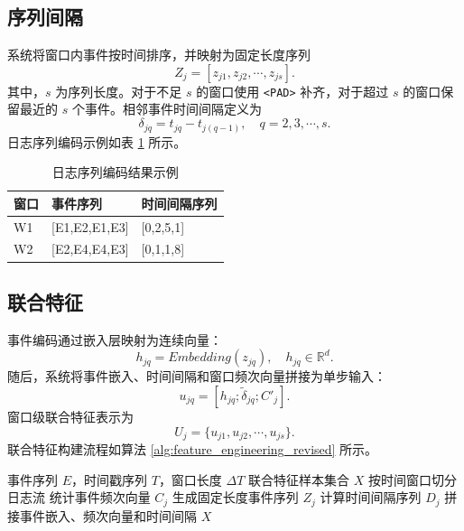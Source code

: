 \subsection{序列间隔}

系统将窗口内事件按时间排序，并映射为固定长度序列
\begin{equation}
    Z_j=[z_{j1},z_{j2},\cdots,z_{js}].
\end{equation}
其中，$s$ 为序列长度。对于不足 $s$ 的窗口使用 \texttt{<PAD>} 补齐，对于超过 $s$ 的窗口保留最近的 $s$ 个事件。相邻事件时间间隔定义为
\begin{equation}
    \delta_{jq}=t_{jq}-t_{j(q-1)},\quad q=2,3,\cdots,s.
\end{equation}
日志序列编码示例如表 \ref{tab:sequence_encoding_example_revised} 所示。

\begin{table}[htbp]
    \centering
    \caption{日志序列编码结果示例}
    \label{tab:sequence_encoding_example_revised}
    \begin{tabular}{p{2cm}p{4.5cm}p{4.5cm}}
        \hline
        \textbf{窗口} & \textbf{事件序列} & \textbf{时间间隔序列} \\
        \hline
        W1 & [E1,E2,E1,E3] & [0,2,5,1] \\
        W2 & [E2,E4,E4,E3] & [0,1,1,8] \\
        \hline
    \end{tabular}
\end{table}

\subsection{联合特征}

事件编码通过嵌入层映射为连续向量：
\begin{equation}
    h_{jq}=Embedding(z_{jq}),\quad h_{jq}\in\mathbb{R}^{d}.
\end{equation}
随后，系统将事件嵌入、时间间隔和窗口频次向量拼接为单步输入：
\begin{equation}
    u_{jq}=[h_{jq};\tilde{\delta}_{jq};C'_j].
\end{equation}
窗口级联合特征表示为
\begin{equation}
    U_j=\{u_{j1},u_{j2},\cdots,u_{js}\}.
\end{equation}
联合特征构建流程如算法 \ref{alg:feature_engineering_revised} 所示。

\begin{algorithm}[htbp]
    \caption{联合特征构建流程}
    \label{alg:feature_engineering_revised}
    \begin{algorithmic}[1]
        \REQUIRE 事件序列 $E$，时间戳序列 $T$，窗口长度 $\Delta T$
        \ENSURE 联合特征样本集合 $X$
        \STATE 按时间窗口切分日志流
            \STATE 统计事件频次向量 $C_j$
            \STATE 生成固定长度事件序列 $Z_j$
            \STATE 计算时间间隔序列 $D_j$
            \STATE 拼接事件嵌入、频次向量和时间间隔
        \ENDFOR
        \RETURN $X$
    \end{algorithmic}
\end{algorithm}

